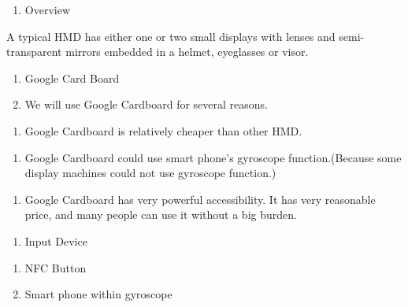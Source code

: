 \documentclass{article}
\begin{document}
\noindent \textit{}

\begin{enumerate}
\item \textit{ }Overview 
\end{enumerate}

\noindent  A typical HMD has either one or two small displays with lenses and semi-transparent mirrors embedded in a helmet, eyeglasses or visor.

\noindent 

\begin{enumerate}
\item   Google Card Board

\item  We will use Google Cardboard for several reasons.
\end{enumerate}

\noindent 

\begin{enumerate}
\item  Google Cardboard is relatively cheaper than other HMD.
\end{enumerate}

\noindent 

\begin{enumerate}
\item  Google Cardboard could use smart phone's gyroscope function.(Because some display machines could not use gyroscope function.)
\end{enumerate}

\noindent 

\begin{enumerate}
\item  Google Cardboard has very powerful accessibility. It has very reasonable price, and many people can use it without a big burden.
\end{enumerate}

\noindent 

\begin{enumerate}
\item  Input Device
\end{enumerate}

\noindent 

\begin{enumerate}
\item  NFC Button

\item  Smart phone within gyroscope
\end{enumerate}
\end{document}
